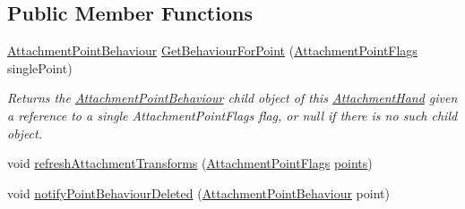 \subsection*{Public Member Functions}
\begin{DoxyCompactItemize}
\item 
\mbox{\hyperlink{class_leap_1_1_unity_1_1_attachments_1_1_attachment_point_behaviour}{Attachment\+Point\+Behaviour}} \mbox{\hyperlink{class_leap_1_1_unity_1_1_attachments_1_1_attachment_hand_a1a0809e8733aa114684f28e6e31f37c5}{Get\+Behaviour\+For\+Point}} (\mbox{\hyperlink{namespace_leap_1_1_unity_1_1_attachments_a4b32b38f722ad110fcd5a817256e09ab}{Attachment\+Point\+Flags}} single\+Point)
\begin{DoxyCompactList}\small\item\em Returns the \mbox{\hyperlink{class_leap_1_1_unity_1_1_attachments_1_1_attachment_point_behaviour}{Attachment\+Point\+Behaviour}} child object of this \mbox{\hyperlink{class_leap_1_1_unity_1_1_attachments_1_1_attachment_hand}{Attachment\+Hand}} given a reference to a single Attachment\+Point\+Flags flag, or null if there is no such child object. \end{DoxyCompactList}\item 
void \mbox{\hyperlink{class_leap_1_1_unity_1_1_attachments_1_1_attachment_hand_ad3c1c16a0e65333e017b6799f0adf234}{refresh\+Attachment\+Transforms}} (\mbox{\hyperlink{namespace_leap_1_1_unity_1_1_attachments_a4b32b38f722ad110fcd5a817256e09ab}{Attachment\+Point\+Flags}} \mbox{\hyperlink{class_leap_1_1_unity_1_1_attachments_1_1_attachment_hand_aeb29b522823d247cf907a2488f1fbebf}{points}})
\item 
void \mbox{\hyperlink{class_leap_1_1_unity_1_1_attachments_1_1_attachment_hand_adedcd7d579e0f342314d32a4af28092b}{notify\+Point\+Behaviour\+Deleted}} (\mbox{\hyperlink{class_leap_1_1_unity_1_1_attachments_1_1_attachment_point_behaviour}{Attachment\+Point\+Behaviour}} point)
\end{DoxyCompactItemize}
